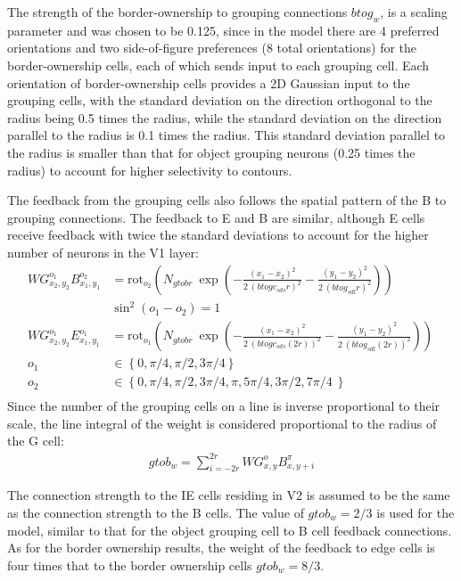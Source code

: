 The strength of the border-ownership to grouping connections $btog_w$,
is a scaling parameter and was chosen to be 0.125, since in the model
there are 4 preferred orientations and two side-of-figure preferences
(8 total orientations) for the border-ownership cells,
each of which sends input to each grouping cell. Each orientation of
border-ownership cells provides a 2D Gaussian input to the grouping
cells, with the standard deviation on the direction orthogonal to the
radius being 0.5 times the radius, while the standard deviation on the
direction parallel to the radius is 0.1 times the radius. This standard deviation parallel to the radius is smaller than that for object grouping neurons (0.25 times the radius) to account for higher selectivity to contours.

The feedback from the grouping cells also follows the spatial pattern of the B to grouping connections. The feedback to E and B are similar, although E cells receive feedback with twice the standard deviations to account for the higher number of neurons in the V1 layer:
\begin{align}
	WG^{o_1}_{x_2,y_2}B^{o_2}_{x_1,y_1}&=\text{rot}_{o_2}\left(N_{gtobr}\: \exp\left(-\frac{(x_1-x_2)^2}{2\: (btogc_{sds} r)^2}
	-\frac{(y_1-y_2)^2}{2\: (btog_{sdl} r)^2}\right)\right)\ \nonumber\\
		        	 &\sin^2(o_1-o_2) = 1 \nonumber\\
	WG^{o_1}_{x_2,y_2}E^{o_1}_{x_1,y_1}&=\text{rot}_{o_1}\left(N_{gtobr}\: \exp\left(-\frac{(x_1-x_2)^2}{2\: (btogc_{sds} (2r))^2}
	-\frac{(y_1-y_2)^2}{2\: (btog_{sdl} (2r))^2}\right)\right)\ \nonumber\\ 
		 o_1&\in \left\{0,\pi/4,\pi/2,3\pi/4 \right\} \nonumber\\
	 o_2&\in \left\{0,\pi/4,\pi/2,3\pi/4,\pi,5\pi/4,3\pi/2,7\pi/4\ \right\} \nonumber\\
\end{align}
Since the number of the grouping cells on a line is
inverse proportional to their scale, the line integral of the weight is considered proportional to the radius of the G cell:
\begin{align}
	gtob_w=\sum^{2r}_{i=-2r} WG^{o}_{x,y}B^{\pi}_{x,y+i}
\end{align}

The connection strength to the IE cells residing in V2 is assumed to be the same as the connection strength to the B cells. The value of $gtob_w=2/3$ is used for the model, similar to that for the object grouping cell to B cell feedback connections. As for the border ownership results, the weight of the feedback to edge cells is four times that to the border ownership cells $gtob_w=8/3$.

